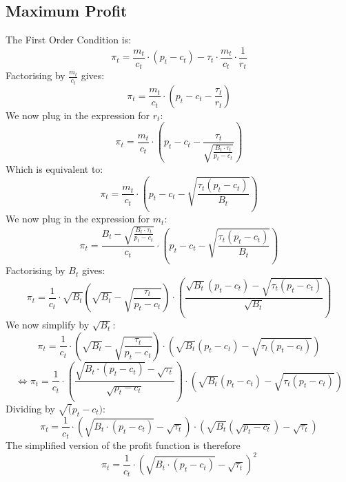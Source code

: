\documentclass{article}
\begin{document}
\subsection{Maximum Profit}
\label{sec:proof5}
The First Order Condition is:
$$\pi_{t}= \frac{m_{t}}{c_{t}}\cdot\left(p_{t}-c_{t}\right)-\tau_{t}\cdot \frac{m_{t}}{c_{t}}\cdot \frac{1}{r_{t}}$$
Factorising by $\frac{m_{t}}{c_{t}}$ gives:
$$\pi_{t}=\frac{m_{t}}{c_{t}}\cdot\left(p_{t}-c_{t}-\frac{\tau_{t}}{r_{t}}\right)$$
We now plug in the expression for $r_{t}$:
$$\pi_{t}=\frac{m_{t}}{c_{t}}\cdot\left(p_{t}-c_{t}-\frac{\tau_{t}}{\sqrt{\frac{B_{t}\cdot \tau_{t}}{p_{t}-c_{t}}}}\right)$$
Which is equivalent to:
$$\pi_{t}=\frac{m_{t}}{c_{t}}\cdot\left(p_{t}-c_{t}-\sqrt{\frac{\tau_{t}(p_{t}-c_{t})}{B_{t}}}\right)$$
We now plug in the expression for $m_{t}$:
$$\pi_{t}=\frac{B_{t}-\sqrt{\frac{B_{t}\cdot \tau_{t}}{p_{t}-c_{t}}}}{c_{t}}\cdot\left(p_{t}-c_{t}-\sqrt{\frac{\tau_{t}(p_{t}-c_{t})}{B_{t}}}\right)$$
Factorising by $B_{t}$ gives:
$$\pi_{t}=\frac{1}{c_{t}}\cdot\sqrt{B_{t}}\left(\sqrt{B_{t}}-\sqrt{\frac{\tau_{t}}{p_{t}-c_{t}}}\right)\cdot\left(\frac{\sqrt{B_{t}}(p_{t}-c_{t})-\sqrt{\tau_{t}(p_{t}-c_{t})}}{\sqrt{B_{t}}}\right)$$
We now simplify by $\sqrt{B_{t}}$:
$$\pi_{t}=\frac{1}{c_{t}}\cdot\left(\sqrt{B_{t}}-\sqrt{\frac{\tau_{t}}{p_{t}-c_{t}}}\right)\cdot\left(\sqrt{B_{t}}(p_{t}-c_{t})-\sqrt{\tau_{t}(p_{t}-c_{t})}\right)$$
$$\Leftrightarrow\pi_{t}=\frac{1}{c_{t}}\cdot\left(\frac{\sqrt{B_{t}\cdot (p_{t}-c_{t})}-\sqrt{\tau_{t}}}{\sqrt{p_{t}-c_{t}}}\right)\cdot\left(\sqrt{B_{t}}(p_{t}-c_{t})-\sqrt{\tau_{t}(p_{t}-c_{t})}\right)$$
Dividing by $\sqrt(p_{t}-c_{t})$:
$$\pi_{t}=\frac{1}{c_{t}}\cdot\left({\sqrt{B_{t}\cdot (p_{t}-c_{t})}-\sqrt{\tau_{t}}}\right)\cdot\left(\sqrt{B_{t}}(\sqrt{p_{t}-c_{t}})-\sqrt{\tau_{t}}\right)$$
The simplified version of the profit function is therefore
\begin{equation}
    \pi_{t}=\frac{1}{c_{t}}\cdot\left({\sqrt{B_{t}\cdot (p_{t}-c_{t})}-\sqrt{\tau_{t}}}\right)^{2}
\end{equation}
\end{document}
